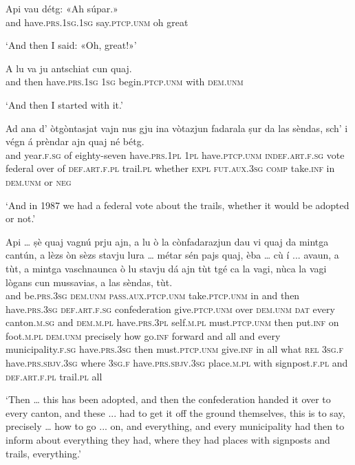 \begin{linenumbers}
\gll Api vau détg: «Ah súpar.»\\
and have.\textsc{prs.1sg.1sg} say.\textsc{ptcp.unm} oh great\\
\end{linenumbers}
\medskip
\glt `And then I said: «Oh, great!»'
\medskip

\begin{linenumbers}
\gll  A lu va ju antschiat cun quaj.  \\
and then have.\textsc{prs.1sg} \textsc{1sg} begin.\textsc{ptcp.unm} with \textsc{dem.unm}\\
\end{linenumbers}
\medskip
\glt `And then I started with it.'
\medskip

\begin{linenumbers}
\gll Ad ana d' òtgòntasjat vajn nus gju ina vòtazjun fadarala ṣur da las sèndas, sch' i végn á prèndar ajn quaj né bétg.   \\
and year.\textsc{f.sg} of eighty-seven have.\textsc{prs.1pl} \textsc{1pl} have.\textsc{ptcp.unm} \textsc{indef.art.f.sg} vote federal over of \textsc{def.art.f.pl} trail.\textsc{pl} whether \textsc{expl} \textsc{fut.aux.3sg} \textsc{comp} take.\textsc{inf} in \textsc{dem.unm} or \textsc{neg}  \\
\end{linenumbers}
\medskip
\glt `And in 1987 we had a federal vote about the trails, whether it would be adopted or not.'
\medskip

\begin{linenumbers}
\gll Api … ṣè quaj vagnú prju ajn, a lu ò la cònfadarazjun dau vi quaj da mintga cantún, a lèzs òn sèzs stavju lura … métar sén pajs quaj, èba … cù í ... avaun, a tùt, a mintga vaschnaunca ò lu stavju dá ajn tùt tgé ca la vagi, nùca la vagi lògans cun mussavias, a las sèndas, tùt.   \\
and {} be.\textsc{prs.3sg} \textsc{dem.unm} \textsc{pass.aux.ptcp.unm} take.\textsc{ptcp.unm} in and then have.\textsc{prs.3sg} \textsc{def.art.f.sg} confederation give.\textsc{ptcp.unm} over \textsc{dem.unm} \textsc{dat} every canton.\textsc{m.sg} and \textsc{dem.m.pl} have.\textsc{prs.3pl} self.\textsc{m.pl} must.\textsc{ptcp.unm} then {} put.\textsc{inf} on foot.\textsc{m.pl} \textsc{dem.unm} precisely {} how go.\textsc{inf} {} forward and all and every municipality.\textsc{f.sg} have.\textsc{prs.3sg} then must.\textsc{ptcp.unm} give.\textsc{inf} in all what \textsc{rel} \textsc{3sg.f} have.\textsc{prs.sbjv.3sg} where \textsc{3sg.f} have.\textsc{prs.sbjv.3sg} place.\textsc{m.pl} with signpost.\textsc{f.pl} and \textsc{def.art.f.pl} trail.\textsc{pl} all \\
\end{linenumbers}
\medskip
\glt `Then … this has been adopted, and then the confederation handed it over to every canton, and these ... had to get it off the ground themselves, this is to say, precisely … how to go ... on, and everything, and every municipality had then to inform about everything they had, where they had places with signposts and trails, everything.'
\medskip


